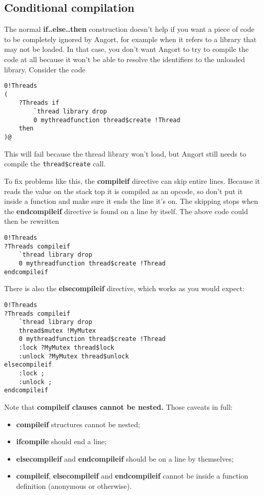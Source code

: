 \subsection{Conditional compilation}
The normal \textbf{if..else..then} construction doesn't help
if you want a piece of code to be completely ignored by Angort,
for example when it refers to a library that may not be loaded.
In that case, you don't want Angort to try to compile the code
at all because it won't be able to resolve the identifiers to
the unloaded library. Consider the code
\begin{lstlisting}
0!Threads
(
    ?Threads if
        `thread library drop
        0 mythreadfunction thread$create !Thread
    then
)@
\end{lstlisting}
This will fail because the thread library won't load, but Angort
still needs to compile the \texttt{thread\$create} call.

To fix problems like this, the \textbf{compileif} directive can skip entire
lines. Because it reads the value on the stack top it is compiled as an
opcode, so don't put it inside a function and make sure it ends the line it's
on. The skipping stops when the \textbf{endcompileif} directive is found on a
line by itself. The above code could then be rewritten
\begin{lstlisting}
0!Threads
?Threads compileif
    `thread library drop
    0 mythreadfunction thread$create !Thread
endcompileif
\end{lstlisting}
There is also the \textbf{elsecompileif} directive, which works as
you would expect:
\begin{lstlisting}
0!Threads
?Threads compileif
    `thread library drop
    thread$mutex !MyMutex
    0 mythreadfunction thread$create !Thread
    :lock ?MyMutex thread$lock
    :unlock ?MyMutex thread$unlock
elsecompileif
    :lock ;
    :unlock ;
endcompileif
\end{lstlisting}
Note that \textbf{compileif clauses cannot be nested.} 
Those caveats in full:
\begin{itemize}
\item \textbf{compileif} structures cannot be nested;
\item \textbf{ifcompile} should end a line;
\item \textbf{elsecompileif} and \textbf{endcompileif} should be on
a line by themselves;
\item \textbf{compileif}, \textbf{elsecompileif} and \textbf{endcompileif} cannot
be inside a function definition (anonymous or otherwise).
\end{itemize}


